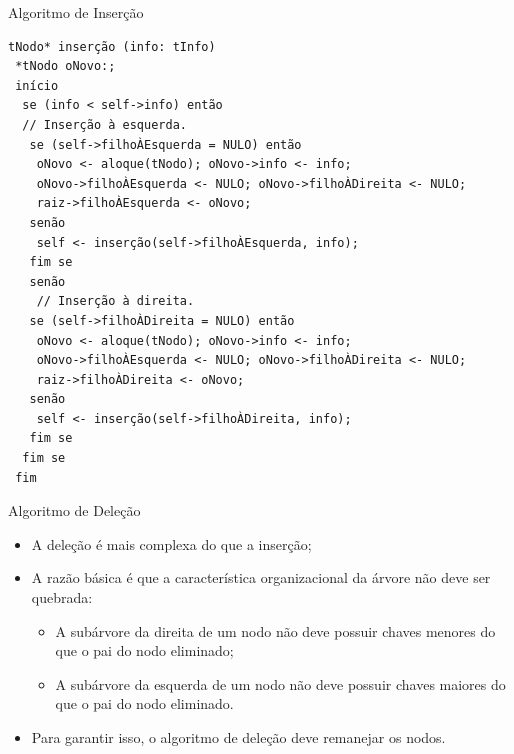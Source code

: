 \documentclass[12pt,table,xcolor={dvipsnames}]{beamer}
\begin{document}
\begin{frame}[fragile]{Algoritmo de Inserção}
          \begin{lstlisting}
tNodo* inserção (info: tInfo)
 *tNodo oNovo:;
 início
  se (info < self->info) então
  // Inserção à esquerda.
   se (self->filhoÀEsquerda = NULO) então
    oNovo <- aloque(tNodo); oNovo->info <- info;
    oNovo->filhoÀEsquerda <- NULO; oNovo->filhoÀDireita <- NULO;
    raiz->filhoÀEsquerda <- oNovo;
   senão
    self <- inserção(self->filhoÀEsquerda, info);
   fim se
   senão
    // Inserção à direita.
   se (self->filhoÀDireita = NULO) então
    oNovo <- aloque(tNodo); oNovo->info <- info;
    oNovo->filhoÀEsquerda <- NULO; oNovo->filhoÀDireita <- NULO;
    raiz->filhoÀDireita <- oNovo;
   senão
    self <- inserção(self->filhoÀDireita, info);
   fim se
  fim se  
 fim
		  \end{lstlisting}
\end{frame} 

\begin{frame}[fragile]{Algoritmo de Deleção}
          \begin{itemize}
          \item A deleção é mais complexa do que a inserção;
		  \item A razão básica é que a característica organizacional da árvore não deve ser quebrada:
		  \begin{itemize}
		  \item A subárvore da direita de um nodo não deve possuir chaves menores do que o pai do nodo eliminado;
		  \item A subárvore da esquerda de um nodo não deve possuir chaves maiores do que o pai do nodo eliminado.
		  \end{itemize}
		  \item Para garantir isso, o algoritmo de deleção deve remanejar os nodos.
       	  \end{itemize}
\end{frame}
\end{document}
